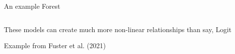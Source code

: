 \documentclass[notes,11pt, aspectratio=169]{beamer}
\newenvironment{wideitemize}{\itemize\addtolength{\itemsep}{10pt}}{\enditemize}
\begin{document}
\begin{frame}{An example Forest}
  \begin{columns}[onlytextwidth, T] %
    \begin{column}{.4\textwidth}
      \begin{wideitemize}
      \item These models can create much more non-linear relationships
        than say, Logit
      \item Example from Fuster et al. (2021)
      \end{wideitemize}
      \end{column}%
      \hfill%
      \begin{column}{.6\textwidth}
      \end{column}%
    \end{columns}
\end{frame}
\end{document}
